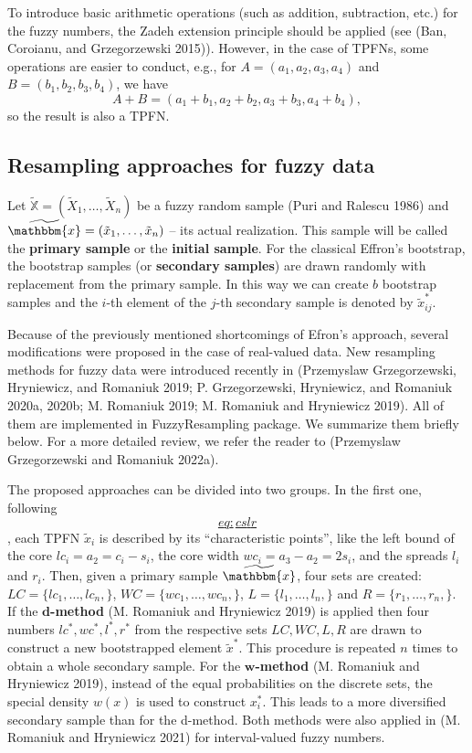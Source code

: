 To introduce basic arithmetic operations (such as addition, subtraction,
etc.) for the fuzzy numbers, the Zadeh extension principle should be
applied (see (Ban, Coroianu, and Grzegorzewski 2015)). However, in the case of TPFNs, some
operations are easier to conduct, e.g., for \(A = (a_1, a_2, a_3, a_4)\)
and \(B = (b_1, b_2, b_3, b_4)\), we have
\[A + B = (a_1+b_1, a_2+b_2, a_3+b_3,a_4+b_4) ,\] so the result is also
a TPFN.

\hypertarget{resampling-approaches-for-fuzzy-data}{%
\subsection{Resampling approaches for fuzzy data}\label{resampling-approaches-for-fuzzy-data}}

Let \(\widetilde{\mathbb{X}}=(\tilde{X}_1,\ldots,\tilde{X}_n)\) be a fuzzy
random sample (Puri and Ralescu 1986) and
\(\widetilde{\mathbbm{x}}=(\tilde{x}_1,\ldots,\tilde{x}_n)\) -- its actual
realization. This sample will be called the \textbf{primary sample} or the
\textbf{initial sample}. For the classical Effron's bootstrap, the bootstrap
samples (or \textbf{secondary samples}) are drawn randomly with replacement
from the primary sample. In this way we can create \(b\) bootstrap samples
and the \(i\)-th element of the \(j\)-th secondary sample is denoted by
\(\tilde{x}_{ij}^*\).

Because of the previously mentioned shortcomings of Efron's approach,
several modifications were proposed in the case of real-valued data. New
resampling methods for fuzzy data were introduced recently in
(Przemyslaw Grzegorzewski, Hryniewicz, and Romaniuk 2019; P. Grzegorzewski, Hryniewicz, and Romaniuk 2020a, 2020b; M. Romaniuk 2019; M. Romaniuk and Hryniewicz 2019).
All of them are implemented in FuzzyResampling package. We summarize
them briefly below. For a more detailed review, we refer the reader to
(Przemyslaw Grzegorzewski and Romaniuk 2022a).

The proposed approaches can be divided into two groups. In the first
one, following \protect\hyperlink{eq:cslr}{\[eq:cslr\]}, each TPFN \(\tilde{x}_i\) is described by its
``characteristic points'', like the left bound of the core
\(lc_i= a_2 =c_i-s_i\), the core width \(wc_i= a_3 - a_2 = 2s_i\), and the
spreads \(l_i\) and \(r_i\). Then, given a primary sample
\(\widetilde{\mathbbm{x}}\), four sets are created:
\(LC = \{ lc_1,\ldots,lc_n,\}\), \(WC = \{ wc_1,\ldots,wc_n,\}\),
\(L = \{ l_1,\ldots,l_n,\}\) and \(R = \{ r_1,\ldots,r_n,\}\). If the
\(\mathbf{d}\)\textbf{-method} (M. Romaniuk and Hryniewicz 2019) is applied then four
numbers \(lc^*, wc^*, l^*, r^*\) from the respective sets \(LC, WC, L, R\)
are drawn to construct a new bootstrapped element \(\tilde{x}^*\). This
procedure is repeated \(n\) times to obtain a whole secondary sample. For
the \(\mathbf{w}\)\textbf{-method} (M. Romaniuk and Hryniewicz 2019), instead of the equal
probabilities on the discrete sets, the special density \(w(x)\) is used
to construct \(x_i^*\). This leads to a more diversified secondary sample
than for the d-method. Both methods were also applied in (M. Romaniuk and Hryniewicz 2021) for
interval-valued fuzzy numbers.

